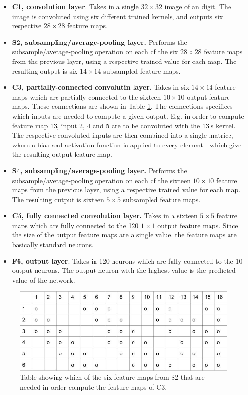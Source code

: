 \begin{itemize}
  \item \textbf{C1, convolution layer}. Takes in a single $ 32 \times 32 $ image of an digit. The image is convoluted using six different trained kernels, and outputs six respective $ 28 \times 28 $ feature maps. 
  \item \textbf{S2, subsampling/average-pooling layer.} Performs the subsample/average-pooling operation on each of the six $ 28 \times 28 $ feature maps from the previous layer, using a respective trained value for each map. The resulting output is six $ 14 \times 14 $ subsampled feature maps. 
  \item \textbf{C3, partially-connected convolutin layer.} Takes in six $ 14 \times 14 $ feature maps which are partially connected to the sixteen $ 10 \times 10 $ output feature maps. These connections are shown in Table \ref{table_partial_connections}. The connections specifices which inputs are needed to compute a given output. E.g. in order to compute feature map 13, input 2, 4 and 5 are to be convoluted with the 13's kernel. The respective convoluted inputs are then combined into a single matrice, where a bias and activation function is applied to every element - which give the resulting output feature map. 
  \item \textbf{S4, subsampling/average-pooling layer.} Performs the subsample/average-pooling operation on each of the sixteen $ 10 \times 10 $ feature maps from the previous layer, using a respective trained value for each map. The resulting output is sixteen $ 5 \times 5 $ subsampled feature maps.
  \item \textbf{C5, fully connected convolution layer.} Takes in a sixteen $ 5 \times 5 $ feature maps which are fully connected to the 120 $ 1 \times 1 $ output feature maps. Since the size of the output feature maps are a single value, the feature maps are basically standard neurons. 
  \item \textbf{F6, output layer}. Takes in 120 neurons which are fully connected to the 10 output neurons. The output neuron with the highest value is the predicted value of the network. 
\end{itemize}


\begin{figure}[h!]
  \centering
      \includegraphics[width=1.0\textwidth]{Figures/Method/partial_connections}
    \caption{Table showing which of the six feature maps from S2 that are needed in order compute the feature maps of C3.}
    \label{table_partial_connections}
\end{figure}

